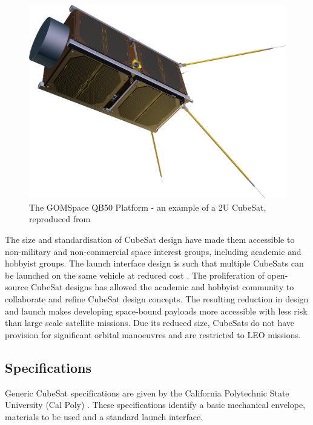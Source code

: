 \begin{figure}[H]
	\centering
	\includegraphics[scale = 0.2]{Pictures/QB50-platform.png}
	
	\caption[The GOMSpace QB50 Platform - an example of a 2U CubeSat]{The GOMSpace QB50 Platform - an example of a 2U CubeSat, reproduced from \cite{GomSpace2013}}
	\label{fig:2U_example}
\end{figure}

The size and standardisation of CubeSat design have made them accessible to non-military and non-commercial space interest groups, including academic and hobbyist groups. The launch interface design is such that multiple CubeSats can be launched on the same vehicle at reduced cost \cite{Nason2002}. The proliferation of open-source CubeSat designs has allowed the academic and hobbyist community to collaborate and refine CubeSat design concepts. The resulting reduction in design and launch makes developing space-bound payloads more accessible with less risk than large scale satellite missions. Due its reduced size, CubeSats do not have provision for significant orbital manoeuvres and are restricted to LEO missions. 

\subsection{Specifications}
Generic CubeSat specifications are given by the California Polytechnic State University (Cal Poly) \cite{Lee2011}. These specifications identify a basic mechanical envelope, materials to be used and a standard launch interface.

